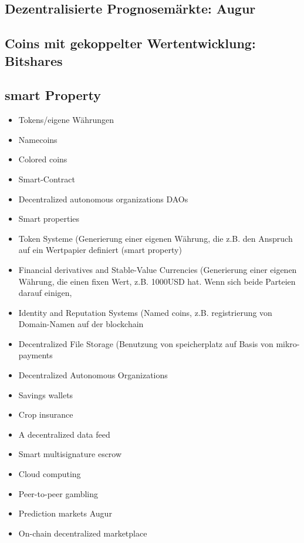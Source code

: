 \subsection{Dezentralisierte Prognosemärkte: Augur}
\subsection{Coins mit gekoppelter Wertentwicklung: Bitshares}
\subsection{smart Property}
\begin{itemize}
	\item Tokens/eigene Währungen
\item Namecoins
\item Colored coins
\item Smart-Contract
\item Decentralized autonomous organizations DAOs
\item Smart properties
\item Token Systeme (Generierung einer eigenen Währung, die z.B. den Anspruch auf ein Wertpapier definiert (smart property)
\item Financial derivatives and Stable-Value Currencies (Generierung einer eigenen Währung, die einen fixen Wert, z.B. 1000USD hat. Wenn sich beide Parteien darauf einigen, 
\item Identity and Reputation Systems (Named coins, z.B. registrierung von Domain-Namen auf der blockchain
\item Decentralized File Storage (Benutzung von speicherplatz auf Basis von mikro-payments
\item Decentralized Autonomous Organizations
\item Savings wallets
\item Crop insurance
\item A decentralized data feed
\item Smart multisignature escrow
\item Cloud computing
\item Peer-to-peer gambling
\item Prediction markets
Augur
\item On-chain decentralized marketplace
\end{itemize}